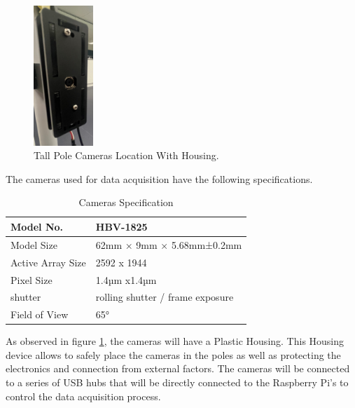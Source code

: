 \documentclass[12pt]{report}
\begin{document}
 
\begin{figure}
  \begin{center}
    \includegraphics[width=0.2\textwidth]{IMG_5885_cropped.jpg}
  \end{center}
  \vspace{-10pt}
  \caption{Tall Pole Cameras Location With Housing.}
  \label{fig:Cameras}
\end{figure}

The cameras used for data acquisition have the following specifications. 
\begin{table}[H]
  \begin{tabular}{|l|l|}
  \hline
  Model No.         & HBV-1825                         \\ \hline
  Model Size        & 62mm × 9mm × 5.68mm±0.2mm        \\ \hline
  Active Array Size & 2592 x 1944                      \\ \hline
  Pixel Size        & 1.4µm x1.4µm                     \\ \hline
  shutter           & rolling shutter / frame exposure \\ \hline
  Field of View     & 65°                              \\ \hline
  \end{tabular}
  \captionsetup{singlelinecheck = false, format= hang, justification=raggedright, font=footnotesize, labelsep=space}
  \caption{Cameras Specification}
  \label{tab:Cameras_specs}
\end{table}

As observed in figure \ref{fig:Cameras}, the cameras will have a Plastic Housing. This Housing device allows to safely place the cameras 
in the poles as well as protecting the electronics and connection from external factors.
The cameras will be connected to a series of USB hubs that will be directly connected to the Raspberry Pi's to control the data acquisition process.
\end{document}
